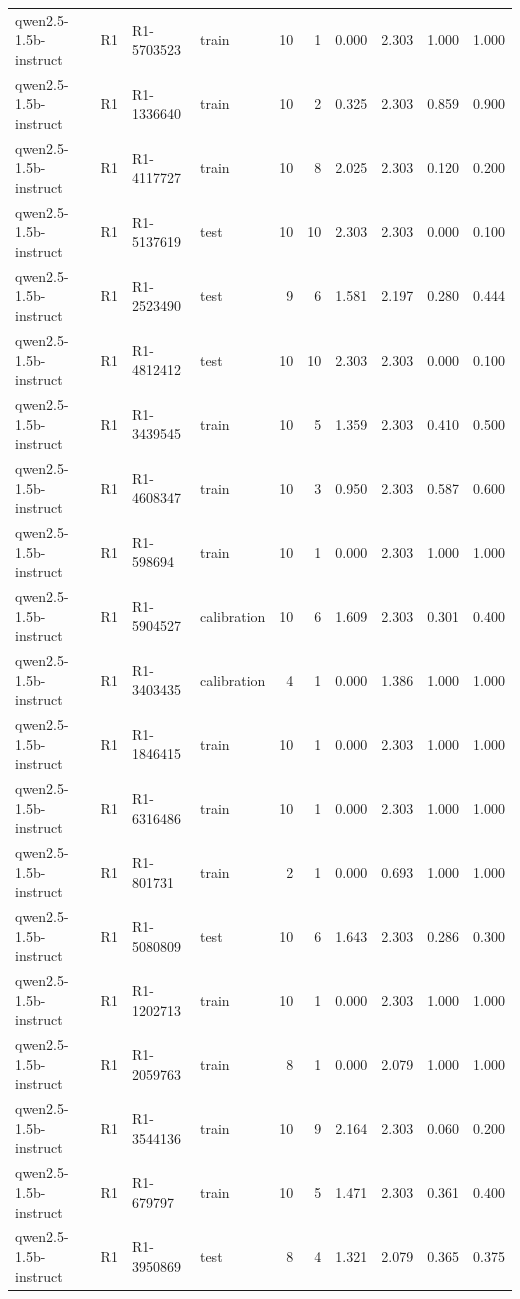 \begin{table}
\begin{tabular}{llllrrrrrr}
qwen2.5-1.5b-instruct & R1 & R1-5703523 & train & 10 & 1 & 0.000 & 2.303 & 1.000 & 1.000 \\
qwen2.5-1.5b-instruct & R1 & R1-1336640 & train & 10 & 2 & 0.325 & 2.303 & 0.859 & 0.900 \\
qwen2.5-1.5b-instruct & R1 & R1-4117727 & train & 10 & 8 & 2.025 & 2.303 & 0.120 & 0.200 \\
qwen2.5-1.5b-instruct & R1 & R1-5137619 & test & 10 & 10 & 2.303 & 2.303 & 0.000 & 0.100 \\
qwen2.5-1.5b-instruct & R1 & R1-2523490 & test & 9 & 6 & 1.581 & 2.197 & 0.280 & 0.444 \\
qwen2.5-1.5b-instruct & R1 & R1-4812412 & test & 10 & 10 & 2.303 & 2.303 & 0.000 & 0.100 \\
qwen2.5-1.5b-instruct & R1 & R1-3439545 & train & 10 & 5 & 1.359 & 2.303 & 0.410 & 0.500 \\
qwen2.5-1.5b-instruct & R1 & R1-4608347 & train & 10 & 3 & 0.950 & 2.303 & 0.587 & 0.600 \\
qwen2.5-1.5b-instruct & R1 & R1-598694 & train & 10 & 1 & 0.000 & 2.303 & 1.000 & 1.000 \\
qwen2.5-1.5b-instruct & R1 & R1-5904527 & calibration & 10 & 6 & 1.609 & 2.303 & 0.301 & 0.400 \\
qwen2.5-1.5b-instruct & R1 & R1-3403435 & calibration & 4 & 1 & 0.000 & 1.386 & 1.000 & 1.000 \\
qwen2.5-1.5b-instruct & R1 & R1-1846415 & train & 10 & 1 & 0.000 & 2.303 & 1.000 & 1.000 \\
qwen2.5-1.5b-instruct & R1 & R1-6316486 & train & 10 & 1 & 0.000 & 2.303 & 1.000 & 1.000 \\
qwen2.5-1.5b-instruct & R1 & R1-801731 & train & 2 & 1 & 0.000 & 0.693 & 1.000 & 1.000 \\
qwen2.5-1.5b-instruct & R1 & R1-5080809 & test & 10 & 6 & 1.643 & 2.303 & 0.286 & 0.300 \\
qwen2.5-1.5b-instruct & R1 & R1-1202713 & train & 10 & 1 & 0.000 & 2.303 & 1.000 & 1.000 \\
qwen2.5-1.5b-instruct & R1 & R1-2059763 & train & 8 & 1 & 0.000 & 2.079 & 1.000 & 1.000 \\
qwen2.5-1.5b-instruct & R1 & R1-3544136 & train & 10 & 9 & 2.164 & 2.303 & 0.060 & 0.200 \\
qwen2.5-1.5b-instruct & R1 & R1-679797 & train & 10 & 5 & 1.471 & 2.303 & 0.361 & 0.400 \\
qwen2.5-1.5b-instruct & R1 & R1-3950869 & test & 8 & 4 & 1.321 & 2.079 & 0.365 & 0.375 \\

\end{tabular}
\end{table}
